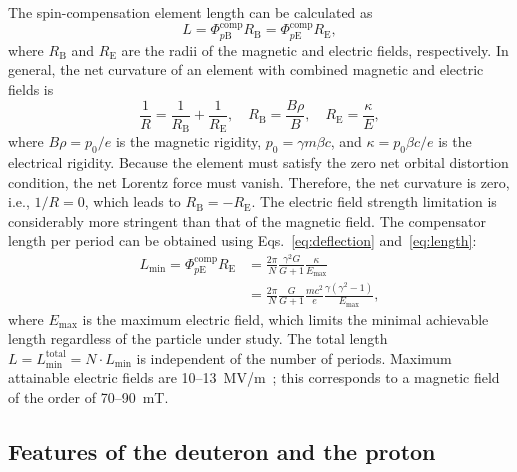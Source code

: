 The spin-compensation element length can be calculated as
\begin{equation}
  L = \Phi_{p\mathrm{B}}^{\mathrm{comp}}R_{\mathrm{B}}
    = \Phi_{p\mathrm{E}}^{\mathrm{comp}}R_{\mathrm{E}},
  \label{eq:length}
\end{equation}
where $R_{\mathrm{B}}$ and $R_{\mathrm{E}}$ are the radii of the magnetic and
electric fields, respectively. In general, the net curvature of an element
with combined magnetic and electric fields is
\begin{equation}
  \frac{1}{R} = \frac{1}{R_{\mathrm{B}}}+\frac{1}{R_{\mathrm{E}}}, \quad
  R_{\mathrm{B}}=\frac{B\rho}{B}, \quad
  R_{\mathrm{E}}=\frac{\kappa}{E},
  \label{eq:total_radius}
\end{equation}
where $B\rho = p_{0}/e$ is the magnetic rigidity, $p_{0} = \gamma m\beta c$,
and $\kappa = p_{0}\beta c/e$ is the electrical rigidity. Because the element
must satisfy the zero net orbital distortion condition, the net Lorentz force
must vanish. Therefore, the net curvature is zero, i.e., $1/R = 0$, which
leads to $R_{\mathrm{B}} = -R_{\mathrm{E}}$. The electric field strength
limitation is considerably more stringent than that of the magnetic field.
The compensator length per period can be obtained using
Eqs.~\eqref{eq:deflection} and~\eqref{eq:length}:
\begin{equation}
\begin{aligned}
  L_{\mathrm{min}} = \Phi_{p\mathrm{E}}^{\mathrm{comp}}R_{\mathrm{E}}
  &= \frac{2\pi}{N}\frac{\gamma^2 G}{G+1}\frac{\kappa}{E_{\mathrm{max}}} \\
  &= \frac{2\pi}{N}\frac{G}{G+1}\frac{mc^2}{e}
     \frac{\gamma(\gamma^2-1)}{E_{\mathrm{max}}},
\end{aligned}
\label{eq:length_min}
\end{equation}
where $E_{\mathrm{max}}$ is the maximum electric field, which limits the
minimal achievable length regardless of the particle under study. The total
length $L=L_{\mathrm{min}}^{\mathrm{total}} = N\cdot L_{\mathrm{min}}$ is
independent of the number of periods. Maximum attainable electric fields are
10--\SI{13}{MV/m}~\cite{Kolokolchikov:2026xbv}; this corresponds to a magnetic
field of the order of 70--\SI{90}{mT}.

\subsection{Features of the deuteron and the proton}
\label{sec:qfs-particles}

